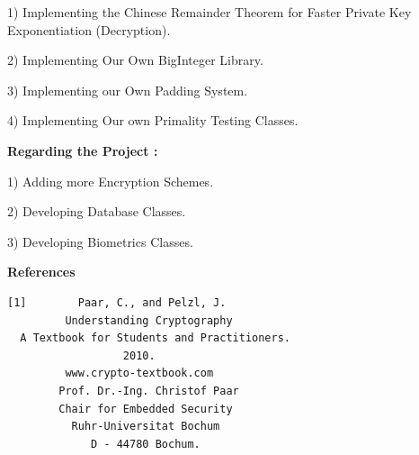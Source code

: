 \documentclass{slides}
\begin{document}
\begin{center}
1) Implementing the Chinese Remainder Theorem for Faster Private Key Exponentiation (Decryption).

2) Implementing Our Own BigInteger Library.

3) Implementing our Own Padding System.

4) Implementing Our own Primality Testing Classes.
\end{center}
\begin{center}
\textbf{Regarding the Project :}

1) Adding more Encryption Schemes.

2) Developing Database Classes.

3) Developing Biometrics Classes.
\end{center}
\newpage
\begin{center}
\textbf{\Large References}
\end{center}
\begin{center}
\begin{BVerbatim}
[1]        Paar, C., and Pelzl, J.
         Understanding Cryptography
  A Textbook for Students and Practitioners.
                  2010.
         www.crypto-textbook.com
        Prof. Dr.-Ing. Christof Paar 
        Chair for Embedded Security
          Ruhr-Universitat Bochum
             D - 44780 Bochum.
\end{BVerbatim}
\end{center}
\end{document}

